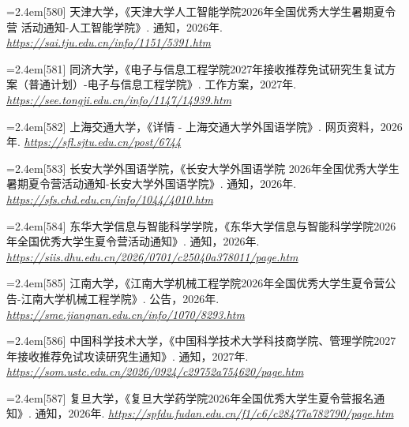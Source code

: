 {\par\noindent\hangindent=2.4em\label{src:S0300}{\color{cAccent}[580]} 天津大学，《天津大学人工智能学院2026年全国优秀大学生暑期夏令营 活动通知-人工智能学院》. 通知，2026年. \textit{\url{https://sai.tju.edu.cn/info/1151/5391.htm}}\par
\par\noindent\hangindent=2.4em\label{src:S0311}{\color{cAccent}[581]} 同济大学，《电子与信息工程学院2027年接收推荐免试研究生复试方案（普通计划）-电子与信息工程学院》. 工作方案，2027年. \textit{\url{https://see.tongji.edu.cn/info/1147/14939.htm}}\par
\par\noindent\hangindent=2.4em\label{src:S0315}{\color{cAccent}[582]} 上海交通大学，《详情 - 上海交通大学外国语学院》. 网页资料，2026年. \textit{\url{https://sfl.sjtu.edu.cn/post/6744}}\par
\par\noindent\hangindent=2.4em\label{src:S0316}{\color{cAccent}[583]} 长安大学外国语学院，《长安大学外国语学院 2026年全国优秀大学生暑期夏令营活动通知-长安大学外国语学院》. 通知，2026年. \textit{\url{https://sfs.chd.edu.cn/info/1044/4010.htm}}\par
\par\noindent\hangindent=2.4em\label{src:S0321}{\color{cAccent}[584]} 东华大学信息与智能科学学院，《东华大学信息与智能科学学院2026年全国优秀大学生夏令营活动通知》. 通知，2026年. \textit{\url{https://siis.dhu.edu.cn/2026/0701/c25040a378011/page.htm}}\par
\par\noindent\hangindent=2.4em\label{src:S0325}{\color{cAccent}[585]} 江南大学，《江南大学机械工程学院2026年全国优秀大学生夏令营公告-江南大学机械工程学院》. 公告，2026年. \textit{\url{https://sme.jiangnan.edu.cn/info/1070/8293.htm}}\par
\par\noindent\hangindent=2.4em\label{src:S0331}{\color{cAccent}[586]} 中国科学技术大学，《中国科学技术大学科技商学院、管理学院2027年接收推荐免试攻读研究生通知》. 通知，2027年. \textit{\url{https://som.ustc.edu.cn/2026/0924/c29752a754620/page.htm}}\par
\par\noindent\hangindent=2.4em\label{src:S0333}{\color{cAccent}[587]} 复旦大学，《复旦大学药学院2026年全国优秀大学生夏令营报名通知》. 通知，2026年. \textit{\url{https://spfdu.fudan.edu.cn/f1/c6/c28477a782790/page.htm}}\par
}
